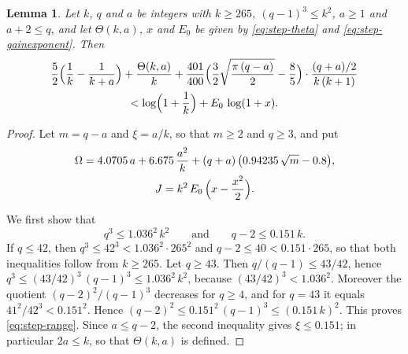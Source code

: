 \documentclass{amsart}
\newtheorem{lemma}[theorem]{Lemma}
\theoremstyle{definition}
\theoremstyle{remark}
\numberwithin{equation}{section}
\begin{document}
\begin{lemma}\label{lem:closedforms}
Let $k$, $q$ and $a$ be integers with $k\ge265$, $(q-1)^3\le k^2$, $a\ge1$
and $a+2\le q$, and let $\Theta(k,a)$, $x$ and $E_0$ be given by
\eqref{eq:step-theta} and \eqref{eq:step-gainexponent}. Then
\begin{multline*}
\frac52\Bigl(\frac1k-\frac1{k+a}\Bigr)+\frac{\Theta(k,a)}{k}
+\frac{401}{400}\Bigl(\frac32\sqrt{\frac{\pi\,(q-a)}{2}}-\frac85\Bigr)\cdot
\frac{(q+a)/2}{k\,(k+1)}\\
<\log\Bigl(1+\frac1k\Bigr)+E_0\,\log(1+x).
\end{multline*}
\end{lemma}

\begin{proof}
Let $m=q-a$ and $\xi=a/k$, so that $m\ge2$ and $q\ge3$, and put
\begin{gather*}
\Omega=4.0705\,a+6.675\,\frac{a^2}{k}
+(q+a)\,\bigl(0.94235\,\sqrt m-0.8\bigr),\\
J=k^2\,E_0\,\Bigl(x-\frac{x^2}{2}\Bigr).
\end{gather*}

We first show that
\begin{equation}\label{eq:step-range}
q^3\le1.036^2\,k^2\qquad\text{and}\qquad q-2\le0.151\,k .
\end{equation}
If $q\le42$, then $q^3\le42^3<1.036^2\cdot265^2$ and
$q-2\le40<0.151\cdot265$, so that both inequalities follow from $k\ge265$.
Let $q\ge43$. Then $q/(q-1)\le43/42$, hence
$q^3\le(43/42)^3\,(q-1)^3\le1.036^2\,k^2$, because $(43/42)^3<1.036^2$.
Moreover the quotient $(q-2)^2/(q-1)^3$ decreases for $q\ge4$, and for
$q=43$ it equals $41^2/42^3<0.151^2$. Hence
$(q-2)^2\le0.151^2\,(q-1)^3\le(0.151\,k)^2$. This proves
\eqref{eq:step-range}. Since $a\le q-2$, the second inequality gives
$\xi\le0.151$; in particular $2a\le k$, so that $\Theta(k,a)$ is defined.


\end{proof}
\end{document}
